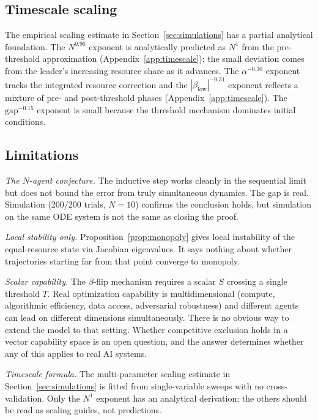 \documentclass[11pt,letterpaper]{article}
\theoremstyle{plain}
\theoremstyle{definition}
\theoremstyle{remark}
\newcommand{\betaL}{\beta_{\mathrm{low}}}
\begin{document}
\subsection{Timescale scaling}

The empirical scaling estimate in Section~\ref{sec:simulations} has a
partial analytical foundation.
The $N^{0.96}$ exponent is analytically predicted as $N^1$ from the
pre-threshold approximation (Appendix~\ref{app:timescale}); the small
deviation comes from the leader's increasing resource share as it
advances.
The $\alpha^{-0.30}$ exponent tracks the integrated resource correction
and the $|\betaL|^{-0.31}$ exponent reflects a mixture of pre- and
post-threshold phases (Appendix~\ref{app:timescale}).
The $\mathrm{gap}^{-0.15}$ exponent is small because the threshold
mechanism dominates initial conditions.

\subsection{Limitations}

\textit{The $N$-agent conjecture.}
The inductive step works cleanly in the sequential limit but does not bound
the error from truly simultaneous dynamics.
The gap is real.
Simulation (200/200 trials, $N=10$) confirms the conclusion holds, but
simulation on the same ODE system is not the same as closing the proof.

\textit{Local stability only.}
Proposition~\ref{prop:monopoly} gives local instability of the equal-resource
state via Jacobian eigenvalues.
It says nothing about whether trajectories starting far from that point
converge to monopoly.

\textit{Scalar capability.}
The $\beta$-flip mechanism requires a scalar $S$ crossing a single threshold
$T$.
Real optimization capability is multidimensional (compute, algorithmic
efficiency, data access, adversarial robustness) and different agents can
lead on different dimensions simultaneously.
There is no obvious way to extend the model to that setting.
Whether competitive exclusion holds in a vector capability space is an open
question, and the answer determines whether any of this applies to real AI
systems.

\textit{Timescale formula.}
The multi-parameter scaling estimate in Section~\ref{sec:simulations}
is fitted from single-variable sweeps with no cross-validation.
Only the $N^1$ exponent has an analytical derivation; the others should
be read as scaling guides, not predictions.
\end{document}
